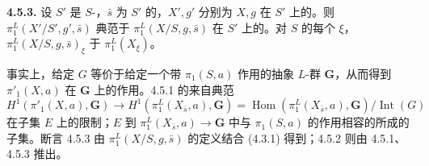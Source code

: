 \textbf{4.5.3.} 设 $S'$ 是 $S$-，$\bar s$ 为 $S'$ 的，$X',g'$ 分别为 $X,g$ 在 $S'$ 上的。则 $\pi_1^L(X'/S',g',\bar s)$ 典范于 $\pi_1^L(X/S,g,\bar s)$ 在 $S'$ 上的。对 $S$ 的每个 $\xi$， $\pi_1^L(X/S,g,\bar s)_\xi$ 于 $\pi_1^L(X_\xi)$。

事实上，给定 $G$ 等价于给定一个带 $\pi_1(S,a)$ 作用的抽象 $L$-群 $\mathbf G$，从而得到 $\pi'_1(X,a)$ 在 $\mathbf G$ 上的作用。4.5.1 的来自典范
\[
H^1(\pi'_1(X,a),\mathbf G)\longrightarrow
H^1(\pi_1^L(X_{\bar s},a),\mathbf G)
=\operatorname{Hom}(\pi_1^L(X_{\bar s},a),\mathbf G)/\operatorname{Int}(G)
\]
在子集 $E$ 上的限制；$E$ 到 $\pi_1^L(X_{\bar s},a)\to\mathbf G$ 中与 $\pi_1(S,a)$ 的作用相容的所成的子集。断言 4.5.3 由 $\pi_1^L(X/S,g,\bar s)$ 的定义结合 (4.3.1) 得到；4.5.2 则由 4.5.1、4.5.3 推出。

